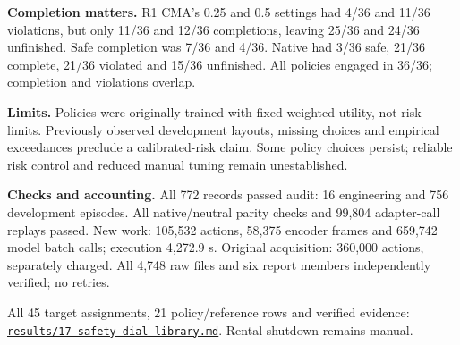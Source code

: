 \documentclass[10pt,a4paper]{article}
\begin{document}
\textbf{Completion matters.} R1 CMA's 0.25 and 0.5 settings had 4/36 and 11/36 violations, but only 11/36 and 12/36 completions, leaving 25/36 and 24/36 unfinished. Safe completion was 7/36 and 4/36. Native had 3/36 safe, 21/36 complete, 21/36 violated and 15/36 unfinished. All policies engaged in 36/36; completion and violations overlap.

\textbf{Limits.} Policies were originally trained with fixed weighted utility, not risk limits. Previously observed development layouts, missing choices and empirical exceedances preclude a calibrated-risk claim. Some policy choices persist; reliable risk control and reduced manual tuning remain unestablished.

\textbf{Checks and accounting.} All 772 records passed audit: 16 engineering and 756 development episodes. All native/neutral parity checks and 99,804 adapter-call replays passed. New work: 105,532 actions, 58,375 encoder frames and 659,742 model batch calls; execution 4,272.9 s. Original acquisition: 360,000 actions, separately charged. All 4,748 raw files and six report members independently verified; no retries.

{\footnotesize All 45 target assignments, 21 policy/reference rows and verified evidence: \href{results/17-safety-dial-library.md}{\texttt{results/17-safety-dial-library.md}}. Rental shutdown remains manual.}
\end{document}
